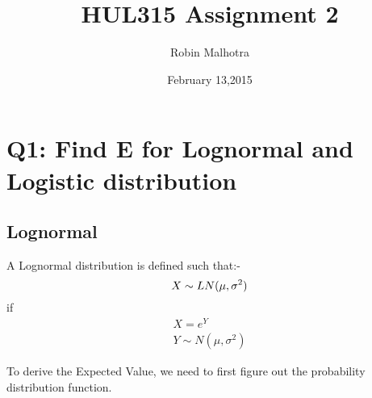 \documentclass[]{article}
\begin{document}
\title{HUL315 Assignment 2}
\author{Robin Malhotra}
\date{February 13,2015}
\maketitle

\section{Q1: Find E \big[X\big] for Lognormal and Logistic distribution} 

\subsection{Lognormal}

A Lognormal distribution is defined such that:-
\begin{equation}\label{first}
X \sim LN(\mu, \sigma^2)\\
\end{equation}
if
\begin{subequations}\label{grp}
\begin{gather}
X=e^Y\label{second}\\
Y\sim N(\mu,\sigma^2)
\end{gather}
\end{subequations}

To derive the Expected Value, we need to first figure out the probability distribution function.
\end{document}
